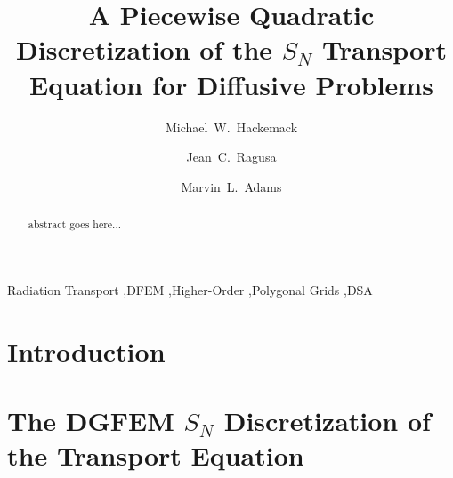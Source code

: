 \documentclass[preprint,review,10pt]{elsarticle}
\begin{document}
\begin{frontmatter}
\title{A Piecewise Quadratic Discretization of the $S_N$ Transport Equation for Diffusive Problems}
\author[kapl]{Michael~W.~Hackemack}
\author[tamu]{Jean~C.~Ragusa}
\author[tamu]{Marvin~L.~Adams}
\address[kapl]{Naval Nuclear Laboratory, KAPL, P.O. Box 1072, Schenectady, NY 12301, USA}
\address[tamu]{Department of Nuclear Engineering, Texas A\&M University, College Station, TX 77843, USA}
\begin{abstract}
abstract goes here...
\end{abstract}
\begin{keyword}
Radiation Transport \sep DFEM \sep Higher-Order \sep Polygonal Grids \sep DSA 
\end{keyword}
\end{frontmatter}

\linenumbers

\section{Introduction} \label{sec::intro}




\section{The DGFEM $S_N$ Discretization of the Transport Equation} \label{sec::trans}


\end{document}
